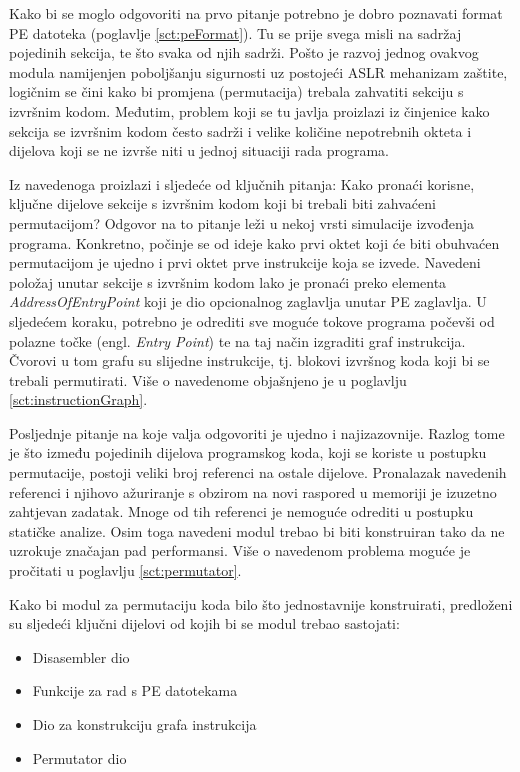 \documentclass[times, utf8, diplomski, numeric]{fer}
\begin{document}
Kako bi se moglo odgovoriti na prvo pitanje potrebno je dobro
poznavati format PE datoteka (poglavlje \ref{sct:peFormat}). Tu se		%
prije svega misli na sadržaj pojedinih sekcija, te što svaka od
njih sadrži. Pošto je razvoj jednog ovakvog modula namijenjen
poboljšanju sigurnosti uz postojeći ASLR mehanizam zaštite,
logičnim se čini kako bi promjena (permutacija) trebala zahvatiti
sekciju s izvršnim kodom. Međutim, problem koji se tu javlja
proizlazi iz činjenice kako sekcija se izvršnim kodom često
sadrži i velike količine nepotrebnih okteta i dijelova koji se ne
izvrše niti u jednoj situaciji rada programa. 

Iz navedenoga proizlazi i sljedeće od ključnih pitanja: Kako
pronaći korisne, ključne dijelove sekcije s izvršnim kodom koji
bi trebali biti zahvaćeni permutacijom? Odgovor na to pitanje
leži u nekoj vrsti simulacije izvođenja programa. Konkretno,
počinje se od ideje kako prvi oktet koji će biti obuhvaćen
permutacijom je ujedno i prvi oktet prve instrukcije koja se
izvede. Navedeni položaj unutar sekcije s izvršnim kodom lako je
pronaći preko elementa \emph{AddressOfEntryPoint} koji je dio
opcionalnog zaglavlja unutar PE zaglavlja. U sljedećem koraku,
potrebno je odrediti sve moguće tokove programa počevši od
polazne točke (engl. \emph{Entry Point}) te na taj način
izgraditi graf instrukcija. Čvorovi u tom grafu su slijedne
instrukcije, tj. blokovi izvršnog koda koji bi se trebali
permutirati. Više o navedenome objašnjeno je u poglavlju 
\ref{sct:instructionGraph}.							%

Posljednje pitanje na koje valja odgovoriti je ujedno i
najizazovnije. Razlog tome je što između pojedinih dijelova
programskog koda, koji se koriste u postupku permutacije, postoji
veliki broj referenci na ostale dijelove. Pronalazak navedenih
referenci i njihovo ažuriranje s obzirom na novi raspored u
memoriji je izuzetno zahtjevan zadatak. Mnoge od tih referenci je
nemoguće odrediti u postupku statičke analize. Osim toga navedeni
modul trebao bi biti konstruiran tako da ne uzrokuje značajan
pad performansi. Više o navedenom problema moguće je pročitati u
poglavlju \ref{sct:permutator}.

Kako bi modul za permutaciju koda bilo što jednostavnije
konstruirati, predloženi su sljedeći ključni dijelovi od kojih bi
se modul trebao sastojati:

\begin{itemize}
\item Disasembler dio
\item Funkcije za rad s PE datotekama
\item Dio za konstrukciju grafa instrukcija
\item Permutator dio
\end{itemize}
\end{document}
